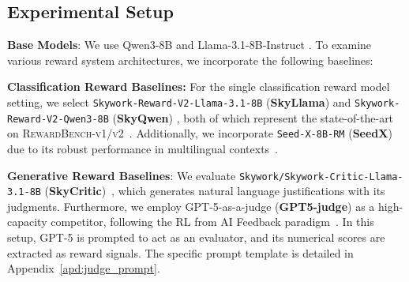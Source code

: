 

\subsection{Experimental Setup} \label{sec:experimental_setup}

\textbf{Base Models}: We use Qwen3-8B \citep{qwen3report} and Llama-3.1-8B-Instruct \citep{llama3report}. To examine various reward system architectures, we incorporate the following baselines:

\noindent\textbf{Classification Reward Baselines:} For the single classification reward model setting, we select \texttt{Skywork-Reward-V2-Llama-3.1-8B} (\textbf{SkyLlama}) and \texttt{Skywork-Reward-V2-Qwen3-8B} (\textbf{SkyQwen}) \citep{skyworkreward}, both of which represent the state-of-the-art on \textsc{RewardBench-v1/v2}~\citep{rewardbench, rewardbench2}. Additionally, we incorporate \texttt{Seed-X-8B-RM} (\textbf{SeedX}) due to its robust performance in multilingual contexts~\citep{seedX}.

\noindent\textbf{Generative Reward Baselines}: We evaluate \texttt{Skywork/Skywork-Critic-Llama-3.1-8B} (\textbf{SkyCritic})~\citep{skyworkcritic2024}, which generates natural language justifications with its judgments. Furthermore, we employ GPT-5-as-a-judge (\textbf{GPT5-judge}) as a high-capacity competitor, following the RL from AI Feedback paradigm~\citep{lee2024rlaif}. In this setup, GPT-5 is prompted to act as an evaluator, and its numerical scores are extracted as reward signals. The specific prompt template is detailed in Appendix~\ref{apd:judge_prompt}.

